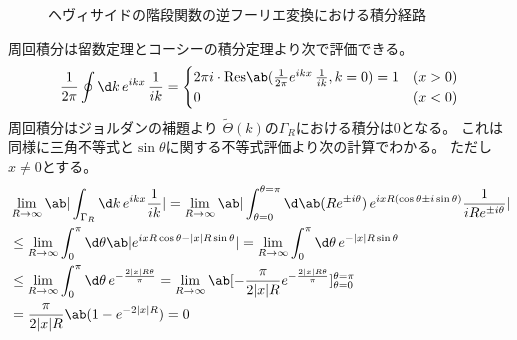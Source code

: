 \begin{figure}[tbp]
\begin{minipage}[b]{0.45\linewidth}
\begin{center}
    \end{center}
  \end{minipage}
  \caption{ヘヴィサイドの階段関数の逆フーリエ変換における積分経路}\label{fig:step_inv_fourier}
\end{figure}
周回積分は留数定理とコーシーの積分定理より次で評価できる。
\begin{equation}
  \frac{1}{2\pi}\oint\d k\,e^{ikx}\,\frac{1}{ik}
  =
  \begin{cases}
    2\pi i\cdot\mathrm{Res}
    \ab(\frac{1}{2\pi}e^{ikx}\,\frac{1}{ik},k=0)=1 & (x>0) \\
    0                                              & (x<0) \\
  \end{cases}
\end{equation}
周回積分はジョルダンの補題より
$\tilde{\Theta}(k)$の$\Gamma_R$における積分は0となる。
これは同様に三角不等式と$\sin\theta$に関する不等式評価より次の計算でわかる。
ただし$x\neq0$とする。
\begin{equation}
  \begin{split}
    &\lim_{R\rightarrow\infty}
    \ab|\int_{\Gamma_R}\d k\,e^{ikx}\frac{1}{ik}|
    =\lim_{R\rightarrow\infty}
    \ab|\int_{\theta=0}^{\theta=\pi}
    \d \ab(Re^{\pm i\theta})\,e^{ixR(\cos\theta\pm i\sin\theta)}\frac{1}{iRe^{\pm i\theta}}| \\
    &\leq\lim_{R\rightarrow\infty}
    \int_0^\pi\d\theta
    \ab|e^{ixR\cos\theta-|x|R\sin\theta}|
    =\lim_{R\rightarrow\infty}
    \int_0^\pi\d\theta\,e^{-|x|R\sin\theta} \\
    &\leq\lim_{R\rightarrow\infty}
    \int_0^\pi\d\theta\,e^{-\frac{2|x|R\theta}{\pi}}
    =\lim_{R\rightarrow\infty}
    \ab[-\frac{\pi}{2|x|R}e^{-\frac{2|x|R\theta}{\pi}}]_{\theta=0}^{\theta=\pi} \\
    &=\frac{\pi}{2|x|R}\ab(1-e^{-2|x|R})=0
  \end{split}
\end{equation}
